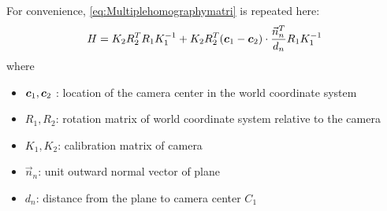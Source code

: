 For convenience, \cref{eq:Multiplehomographymatri} is repeated here:
\begin{align}
	H=K_{2}R_{2}^T R_{1}K_{1}^{-1}+K_{2}R_{2}^T(\boldsymbol{c}_{1}-\boldsymbol{c}_{2})\cdot \frac{\vec{n}_n^{T}}{d_n}R_{1}K_{1}^{-1}\nonumber
\end{align}
where 
\begin{itemize}
	\item $\boldsymbol{c}_{1},\boldsymbol{c}_{2}$ : location of the camera center in the world coordinate system
	\item $R_{1},R_{2}$: rotation matrix of world coordinate system relative to the camera
	\item $K_{1},K_{2}$: calibration matrix of camera
	\item $\vec{n}_n$: unit outward normal vector of plane
	\item $d_n$: distance from the plane to camera center $C_1$
\end{itemize}

